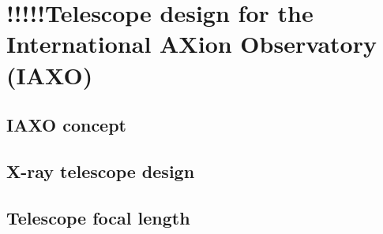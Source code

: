 \chapter{!!!!!Telescope design for the International AXion Observatory (IAXO)}
\section{IAXO concept}
\section{X-ray telescope design}
\section{Telescope focal length}
